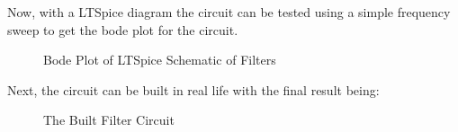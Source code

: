 \documentclass{article}
\begin{document}
Now, with a LTSpice diagram the circuit can be tested using a simple frequency sweep to get the bode plot for the circuit.
\begin{figure}[h]
    \centering
    \caption{Bode Plot of LTSpice Schematic of Filters}
    \label{figure:LTSpiceFilterBode}
\end{figure}
\newpage
Next, the circuit can be built in real life with the final result being:
\begin{figure}[h]
    \centering
    \caption{The Built Filter Circuit}
    \label{figure:BuiltFilter}
\end{figure}
\end{document}
